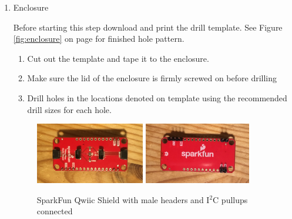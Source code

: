 \documentclass[11pt, letterpaper]{article}
\begin{document}
\begin{enumerate}
\item
Enclosure

Before starting this step download and print the drill template. See Figure \ref{fig:enclosure} on page \pageref{fig:enclosure} for finished hole pattern.

\begin{enumerate}[label=2.\arabic*]
\item
Cut out the template and tape it to the enclosure.
\item
Make sure the lid of the enclosure is firmly screwed on before drilling
\item
Drill holes in the locations denoted on template using the recommended drill sizes for each hole. 
\end{enumerate}

\begin{figure}[H]
\centering
\includegraphics[width=0.45\textwidth]{images/qwiic_top.JPG}
\includegraphics[width=0.44\textwidth]{images/qwiic_bottom.JPG}
\caption{SparkFun Qwiic Shield with male headers and I$^2$C pullups connected} 
\label{fig:qwiic}
\end{figure}


\end{enumerate}
\end{document}
